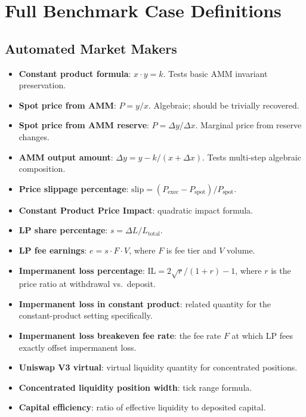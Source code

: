 \documentclass[twoside,11pt]{article}
\begin{document}
\section{Full Benchmark Case Definitions}\label{sec:benchmark_cases}
\label{app:cases}

\subsection{Automated Market Makers}\label{subsec:automated-market-makers}
\label{sec:bench_amm}

\begin{itemize}
  \item \textbf{Constant product formula}: $x \cdot y = k$.
    Tests basic AMM invariant preservation.
  \item \textbf{Spot price from AMM}: $P = y/x$.
    Algebraic; should be trivially recovered.
  \item \textbf{Spot price from AMM reserve}: $P = \Delta y / \Delta x$.
    Marginal price from reserve changes.
  \item \textbf{AMM output amount}: $\Delta y = y - k/(x + \Delta x)$.
    Tests multi-step algebraic composition.
  \item \textbf{Price slippage percentage}: $\mathrm{slip} = (P_{\mathrm{exec}} - P_{\mathrm{spot}})/P_{\mathrm{spot}}$.
  \item \textbf{Constant Product Price Impact}: quadratic impact formula.
  \item \textbf{LP share percentage}: $s = \Delta L / L_{\mathrm{total}}$.
  \item \textbf{LP fee earnings}: $e = s \cdot F \cdot V$, where $F$ is fee tier and $V$ volume.
  \item \textbf{Impermanent loss percentage}: $\mathrm{IL} = 2\sqrt{r}/(1+r) - 1$,
    where $r$ is the price ratio at withdrawal vs.\ deposit.
  \item \textbf{Impermanent loss in constant product}: related quantity for the
    constant-product setting specifically.
  \item \textbf{Impermanent loss breakeven fee rate}: the fee rate $F$ at which
    LP fees exactly offset impermanent loss.
  \item \textbf{Uniswap V3 virtual}: virtual liquidity quantity for
    concentrated positions.
  \item \textbf{Concentrated liquidity position width}: tick range formula.
  \item \textbf{Capital efficiency}: ratio of effective liquidity to deposited capital.
\end{itemize}
\end{document}
